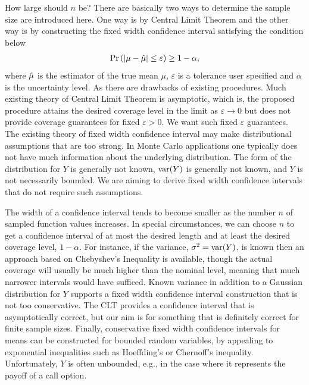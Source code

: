 \documentclass{iitthesis}
\theoremstyle{definition}
\begin{document}

How large should $n$ be? There are basically two ways to determine the sample size are introduced here. One way is by Central Limit Theorem and the other way is by constructing the fixed width confidence interval satisfying the condition below
\begin{align}
\Pr \left(\left \lvert \mu-\hat{\mu} \right \rvert \leq \varepsilon \right) \geq 1-\alpha,
\end{align}
where $\hat{\mu}$ is the estimator of the true mean $\mu$, $\varepsilon$ is a tolerance user specified and $\alpha$ is the uncertainty level.
As there are drawbacks of existing procedures.  Much existing theory of Central Limit Theorem is asymptotic, which is, the proposed procedure attains the desired coverage level in the limit as $\varepsilon\to 0$ but does not provide coverage guarantees for fixed $\varepsilon>0$.  We want such fixed $\varepsilon$ guarantees.  The existing theory of fixed width confidence interval may make distributional assumptions that are too strong.  In Monte Carlo applications one typically does not have much information about the underlying distribution. The form of the distribution for $Y$ is generally not known, $\operatorname{var}(Y)$ is generally not known, and $Y$ is not necessarily bounded. We are aiming to derive fixed width confidence intervals that do not require such assumptions.  

The width of a confidence interval tends to become smaller as the number $n$ of sampled
function values increases. In special circumstances, we can choose $n$ to get a confidence interval of at most the desired length and at least the desired coverage level, $1-\alpha$. For instance, if the variance, $\sigma^2=\operatorname{var}(Y)$, is known then an approach based on Chebyshev's Inequality is available, though the actual coverage will usually be much higher than the nominal level, meaning that much narrower intervals would have sufficed. Known variance in addition to a Gaussian distribution for $Y$ supports a fixed width confidence interval construction that is not too conservative. The CLT provides a confidence interval that is asymptotically correct, but our aim is for something that is definitely correct for finite sample sizes. Finally, conservative fixed width confidence intervals for means can be constructed for bounded random variables, by appealing to exponential inequalities such as Hoeffding's or Chernoff's inequality.  Unfortunately, $Y$ is often unbounded, e.g., in the case where it represents the payoff of a call option.
\end{document}
